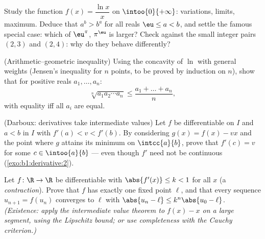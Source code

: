 \begin{exercise}[$\star\star$]\label{exo:b1:derivative:8}
Study the function $f(x) = \dfrac{\ln x}{x}$ on
$\intoo{0}{+\infty}$: variations, limits, maximum. Deduce that $a^b
> b^a$ for all reals $\eu \leq a < b$, and settle the famous special
case: which of $\eu^\pi$, $\pi^\eu$ is larger? Check against the
small integer pairs $(2,3)$ and $(2,4)$: why do they behave
differently?
\end{exercise}

\begin{exercise}[$\star\star$]\label{exo:b1:derivative:9}
(Arithmetic--geometric inequality) Using the concavity of $\ln$ with
general weights (Jensen's inequality for $n$ points, to be proved by
induction on $n$), show that for positive reals $a_1, \dots, a_n$:
\[
\sqrt[n]{a_1 a_2 \cdots a_n} \leq \frac{a_1 + \dots + a_n}{n},
\]
with equality iff all $a_i$ are equal.
\end{exercise}

\begin{exercise}[$\star\star\star$]\label{exo:b1:derivative:10}
(Darboux: derivatives take intermediate values) Let $f$ be
differentiable on $I$ and $a < b$ in $I$ with $f'(a) < v < f'(b)$.
By considering $g(x) = f(x) - vx$ and the point where $g$ attains
its minimum on $\intcc{a}{b}$, prove that $f'(c) = v$ for some $c
\in \intoo{a}{b}$ --- even though $f'$ need not be continuous
(\cref{exo:b1:derivative:2}).
\end{exercise}

\begin{exercise}[$\star\star\star$]\label{exo:b1:derivative:11}
Let $f \colon \R \to \R$ be differentiable with $\abs{f'(x)} \leq k
< 1$ for all $x$ (a \emph{contraction}). Prove that $f$ has exactly
one fixed point $\ell$, and that every sequence $u_{n+1} = f(u_n)$
converges to $\ell$ with $\abs{u_n - \ell} \leq k^n\abs{u_0 -
\ell}$. \emph{(Existence: apply the intermediate value theorem to
$f(x) - x$ on a large segment, using the Lipschitz bound; or use
completeness with the Cauchy criterion.)}
\end{exercise}

